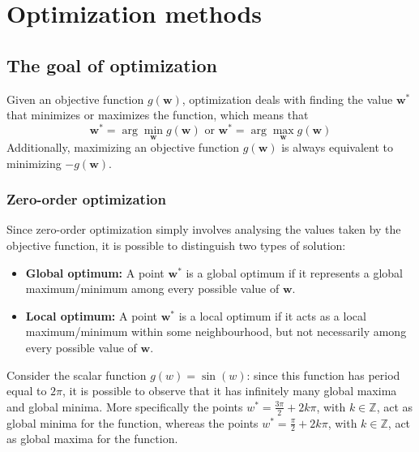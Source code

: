 \documentclass{report}
\begin{document}
\chapter{Optimization methods}
\section{The goal of optimization}
Given an objective function $\displaystyle g(\mathbf{w})$, optimization deals with finding the value $\displaystyle \mathbf{w}^*$ that minimizes or maximizes the function, which means that
\[\mathbf{w}^* = \arg\min_{\mathbf{w}} g(\mathbf{w}) \text{ or } \mathbf{w}^* = \arg\max_{\mathbf{w}} g(\mathbf{w})\]
Additionally, maximizing an objective function $\displaystyle g(\mathbf{w})$ is always equivalent to minimizing $\displaystyle -g(\mathbf{w})$.
\subsection{Zero-order optimization}
Since zero-order optimization simply involves analysing the values taken by the objective function, it is possible to distinguish two types of solution:
\begin{itemize}
    \item \textbf{Global optimum: }A point $\displaystyle \mathbf{w}^*$ is a global optimum if it represents a global maximum/minimum among every possible value of $\displaystyle \mathbf{w}$.
    \item \textbf{Local optimum: }A point $\displaystyle \mathbf{w}^*$ is a local optimum if it acts as a local maximum/minimum within some neighbourhood, but not necessarily among every possible value of $\displaystyle \mathbf{w}$.
\end{itemize}
\begin{examplebox}
    Consider the scalar function $\displaystyle g(w) = \sin(w)$: since this function has period equal to $\displaystyle 2\pi$, it is possible to observe that it has infinitely many global maxima and global minima. \newline
    More specifically the points $\displaystyle w^* = \frac{3\pi}{2} + 2k\pi$, with $\displaystyle k \in \mathbb{Z}$, act as global minima for the function, whereas the points $\displaystyle w^* = \frac{\pi}{2} + 2k\pi$, with $\displaystyle k \in \mathbb{Z}$, act as global maxima for the function.
\end{examplebox}
\end{document}
